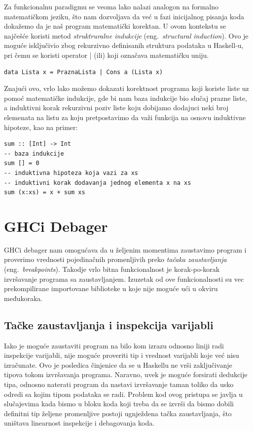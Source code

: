 \documentclass[a4paper]{article}
\begin{document}
{Za funkcionalnu paradigmu se veoma lako nalazi analogon na formalno matematičkom jeziku, što nam dozvoljava da već u fazi inicijalnog pisanja koda dokažemo da je naš program matematički korektan. U ovom kontekstu se najčešće koristi metod {\em struktruralne indukcije}  (eng.~{\em structural induction}). Ovo je moguće isključivio zbog rekurzivno definisanih struktura podataka u Haskell-u\cite{craftOfFuncProg}, pri čemu se koristi operator | (ili) koji označava matematičku uniju.
\begin{lstlisting}[caption={Rekurzivno definisanje liste u Haskellu},frame=single, label=simple]
data Lista x = PraznaLista | Cons a (Lista x)
\end{lstlisting}
Znajući ovo, vrlo lako možemo dokazati korektnost programa koji koriste liste uz pomoć matematičke indukcije, gde bi nam baza indukcije bio slučaj prazne liste, a induktivni korak rekurzivni poziv liste koju dobijamo dodajuci neki broj elemenata na listu za koju pretpostavimo da važi funkcija na osnovu induktivne hipoteze, kao na primer:
\begin{lstlisting}[caption={Primer rekurzivno definisane funkcije},frame=single, label=simple]
sum :: [Int] -> Int
-- baza indukcije
sum [] = 0
-- induktivna hipoteza koja vazi za xs
-- induktivni korak dodavanja jednog elementa x na xs
sum (x:xs) = x + sum xs 
\end{lstlisting}


\section{GHCi Debager}
GHCi debager nam omogućava da u željenim momentima zaustavimo program i proverimo vrednosti pojedinačnih promenljivih preko {\em tačaka zaustavljanja} (eng.~{\em breakpoints}). Takodje vrlo bitna funkcionalnost je korak-po-korak izvršavanje programa sa zaustavljanjem. Izuzetak od ove funkcionalnosti su vec prekompilirane importovane biblioteke u koje nije moguće ući u okviru međukoraka.


\subsection{Tačke zaustavljanja i inspekcija varijabli}
Iako je moguće zaustaviti program na bilo kom izrazu odnosno liniji radi inspekcije varijabli, nije moguće proveriti tip i vrednost varijabli koje već nisu izračunate. Ovo je posledica činjenice da se u Haskellu ne vrši zaključivanje tipova tokom izvršavanja programa. Naravno, uvek je moguće forsirati dedukcije tipa, odnosno naterati program da nastavi izvršavanje taman toliko da usko odredi sa kojim tipom podataka se radi. Problem kod ovog pristupa se javlja u slučajevima kada bismo u bloku koda koji treba da se izvrši da bismo dobili definitni tip željene promenljive postoji ugnježdena tačka zaustavljanja, što uništava linearnost inspekcije i debagovanja koda. 

}
\end{document}

